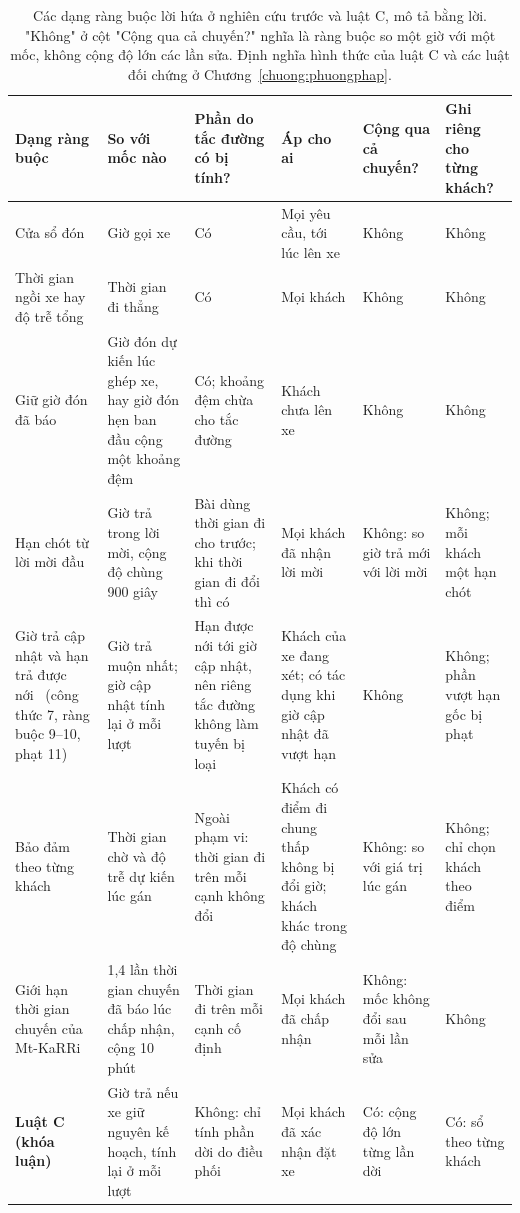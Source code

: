 \begin{table}[htbp]
\centering
\caption{Các dạng ràng buộc lời hứa ở nghiên cứu trước và luật C, mô tả bằng lời. "Không" ở cột "Cộng qua cả
chuyến?" nghĩa là ràng buộc so một giờ với một mốc, không cộng độ lớn các lần sửa. Định nghĩa hình thức của luật C và
các luật đối chứng ở Chương~\ref{chuong:phuongphap}.}
\label{bang:c2-dangrangbuoc}
\footnotesize
\setlength{\tabcolsep}{3pt}
\begin{tabular}{@{}p{2.7cm}p{2.6cm}p{2.5cm}p{2.5cm}p{2.3cm}p{2.3cm}@{}}
\toprule
\textbf{Dạng ràng buộc} & \textbf{So với mốc nào} & \textbf{Phần do tắc đường có bị tính?} & \textbf{Áp cho ai} &
\textbf{Cộng qua cả chuyến?} & \textbf{Ghi riêng cho từng khách?}\\
\midrule
Cửa sổ đón~\cite{alonsomora2017} & Giờ gọi xe & Có & Mọi yêu cầu, tới lúc lên xe & Không & Không\\
Thời gian ngồi xe hay độ trễ tổng~\cite{alonsomora2017,molenbruch2017} & Thời gian đi thẳng & Có & Mọi khách & Không
& Không\\
Giữ giờ đón đã báo~\cite{alonsomora2017,lu2024} & Giờ đón dự kiến lúc ghép xe, hay giờ đón hẹn ban đầu cộng một
khoảng đệm & Có; khoảng đệm chừa cho tắc đường & Khách chưa lên xe & Không & Không\\
Hạn chót từ lời mời đầu~\cite{schulz2026} & Giờ trả trong lời mời, cộng độ chùng 900 giây & Bài dùng thời gian đi cho
trước; khi thời gian đi đổi thì có & Mọi khách đã nhận lời mời & Không: so giờ trả mới với lời mời & Không; mỗi khách
một hạn chót\\
Giờ trả cập nhật và hạn trả được nới~\cite{horl2022} (công thức 7, ràng buộc 9--10, phạt 11) & Giờ trả muộn nhất;
giờ cập nhật tính lại ở mỗi lượt & Hạn được nới tới giờ cập nhật, nên riêng tắc đường không làm tuyến bị loại & Khách
của xe đang xét; có tác dụng khi giờ cập nhật đã vượt hạn & Không & Không; phần vượt hạn gốc bị phạt\\
Bảo đảm theo từng khách~\cite{elmi2026} & Thời gian chờ và độ trễ dự kiến lúc gán & Ngoài phạm vi: thời gian đi trên
mỗi cạnh không đổi & Khách có điểm đi chung thấp không bị đổi giờ; khách khác trong độ chùng & Không: so với giá trị
lúc gán & Không; chỉ chọn khách theo điểm\\
Giới hạn thời gian chuyến của Mt-KaRRi~\cite{laupichler2026} & 1,4 lần thời gian chuyến đã báo lúc chấp nhận, cộng
10 phút & Thời gian đi trên mỗi cạnh cố định & Mọi khách đã chấp nhận & Không: mốc không đổi sau mỗi lần sửa & Không\\
\textbf{Luật C (khóa luận)} & Giờ trả nếu xe giữ nguyên kế hoạch, tính lại ở mỗi lượt & Không: chỉ tính phần dời do
điều phối & Mọi khách đã xác nhận đặt xe & Có: cộng độ lớn từng lần dời & Có: sổ theo từng khách\\
\bottomrule
\end{tabular}
\end{table}

